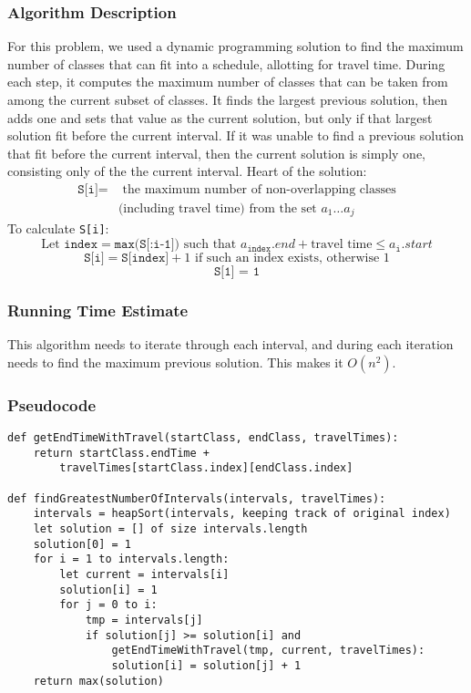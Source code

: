 \documentclass{math}
\begin{document}
\subsubsection*{Algorithm Description}
For this problem, we used a dynamic programming solution to find the maximum
number of classes that can fit into a schedule, allotting for travel time.
During each step, it computes the maximum number of classes that can be taken
from among the current subset of classes. It finds the largest previous
solution, then adds one and sets that value as the current solution, but only
if that largest solution fit before the current interval. If it was unable to
find a previous solution that fit before the current interval, then the current
solution is simply one, consisting only of the the current interval. Heart of
the solution:
\begin{align*}
  \texttt{S[i]} =& \text{ the maximum number of non-overlapping classes} \\
  & \text{(including travel time) from the set } a_{1}\dots a_{j}
\end{align*}
To calculate \texttt{S[i]}:
\[ \text{Let } \texttt{index} = \texttt{max(S[:i-1])} \text{ such that }
  a_{\texttt{index}}.end + \text{travel time} \le a_{\texttt{i}}.start \]
\[ \texttt{S[i]} = \texttt{S[index]} + 1 \text{ if such an index exists,
  otherwise } 1 \]
\[ \texttt{S[1] = 1} \]

\subsubsection*{Running Time Estimate}
This algorithm needs to iterate through each interval, and during each
iteration needs to find the maximum previous solution. This makes it
\( O(n^2) \).

\subsubsection*{Pseudocode}
\begin{lstlisting}
def getEndTimeWithTravel(startClass, endClass, travelTimes):
    return startClass.endTime +
        travelTimes[startClass.index][endClass.index]

def findGreatestNumberOfIntervals(intervals, travelTimes):
    intervals = heapSort(intervals, keeping track of original index)
    let solution = [] of size intervals.length
    solution[0] = 1
    for i = 1 to intervals.length:
        let current = intervals[i]
        solution[i] = 1
        for j = 0 to i:
            tmp = intervals[j]
            if solution[j] >= solution[i] and
                getEndTimeWithTravel(tmp, current, travelTimes):
                solution[i] = solution[j] + 1
    return max(solution)
\end{lstlisting}
\end{document}
